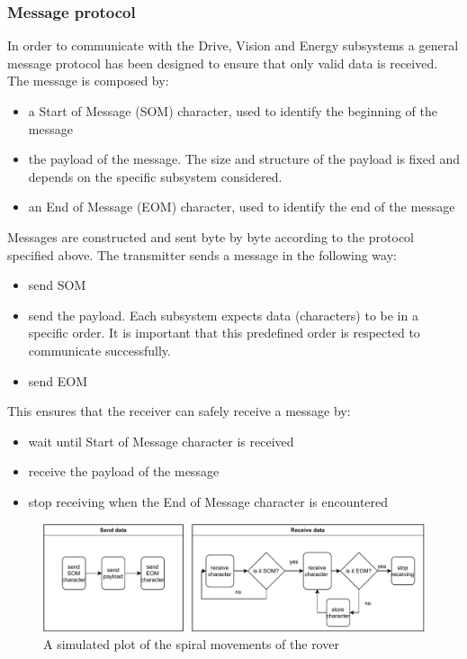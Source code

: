 \documentclass[10pt,twoside]{article}
\begin{document}
\subsubsection{Message protocol} 
In order to communicate with the Drive, Vision and Energy subsystems a general message protocol has been designed to ensure that only valid data is received. The message is composed by:
\begin{itemize}[noitemsep]
    \item a Start of Message (SOM) character, used to identify the beginning of the message
    \item the payload of the message. The size and structure of the payload is fixed and depends on the specific subsystem considered.
    \item an End of Message (EOM) character, used to identify the end of the message
\end{itemize}

Messages are constructed and sent byte by byte according to the protocol specified above.
The transmitter sends a message in the following way:
\begin{itemize}[noitemsep]
    \item send SOM
    \item send the payload. Each subsystem expects data (characters) to be in a specific order. It is important that this predefined order is respected to communicate successfully. 
    \item send EOM
\end{itemize}
This ensures that the receiver can safely receive a message by:
\begin{itemize}[noitemsep]
    \item wait until Start of Message character is received
    \item receive the payload of the message
    \item stop receiving when the End of Message character is encountered
\end{itemize}

\begin{figure}[hbt]
    \centering
    \includegraphics[width = \textwidth]{Send_and_receive.pdf}
    \caption{A simulated plot of the spiral movements of the rover}
    \label{fig:CommandSpiralView}
\end{figure}
\end{document}
